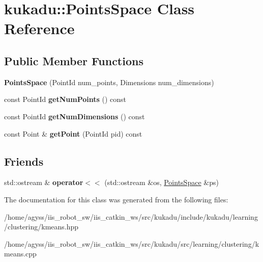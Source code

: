 \hypertarget{classkukadu_1_1PointsSpace}{}\section{kukadu\+:\+:Points\+Space Class Reference}
\label{classkukadu_1_1PointsSpace}
\subsection*{Public Member Functions}
\begin{DoxyCompactItemize}
\item 
{\bfseries Points\+Space} (Point\+Id num\+\_\+points, Dimensions num\+\_\+dimensions)\hypertarget{classkukadu_1_1PointsSpace_a5a07cded0e8d9f863e4148e292fc4819}{}\label{classkukadu_1_1PointsSpace_a5a07cded0e8d9f863e4148e292fc4819}

\item 
const Point\+Id {\bfseries get\+Num\+Points} () const \hypertarget{classkukadu_1_1PointsSpace_a72b707dcad9ec5cbf9eb056848f5a13a}{}\label{classkukadu_1_1PointsSpace_a72b707dcad9ec5cbf9eb056848f5a13a}

\item 
const Point\+Id {\bfseries get\+Num\+Dimensions} () const \hypertarget{classkukadu_1_1PointsSpace_a11f7b273471ae09eac6b0069df903a24}{}\label{classkukadu_1_1PointsSpace_a11f7b273471ae09eac6b0069df903a24}

\item 
const Point \& {\bfseries get\+Point} (Point\+Id pid) const \hypertarget{classkukadu_1_1PointsSpace_ac984b05c87343f7d71e49a467cecd594}{}\label{classkukadu_1_1PointsSpace_ac984b05c87343f7d71e49a467cecd594}

\end{DoxyCompactItemize}
\subsection*{Friends}
\begin{DoxyCompactItemize}
\item 
std\+::ostream \& {\bfseries operator$<$$<$} (std\+::ostream \&os, \hyperlink{classkukadu_1_1PointsSpace}{Points\+Space} \&ps)\hypertarget{classkukadu_1_1PointsSpace_a1a8e4dc95f93b9aa303dda0349f1feec}{}\label{classkukadu_1_1PointsSpace_a1a8e4dc95f93b9aa303dda0349f1feec}

\end{DoxyCompactItemize}


The documentation for this class was generated from the following files\+:\begin{DoxyCompactItemize}
\item 
/home/agyss/iis\+\_\+robot\+\_\+sw/iis\+\_\+catkin\+\_\+ws/src/kukadu/include/kukadu/learning/clustering/kmeans.\+hpp\item 
/home/agyss/iis\+\_\+robot\+\_\+sw/iis\+\_\+catkin\+\_\+ws/src/kukadu/src/learning/clustering/kmeans.\+cpp\end{DoxyCompactItemize}
